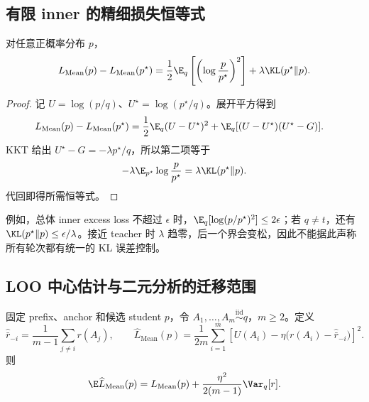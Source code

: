 \subsection{有限 inner 的精细损失恒等式}

\begin{proposition}
\label{prop:mean-opd-excess-identity}
对任意正概率分布 $p$，
\begin{equation}
 L_{\mathrm{Mean}}(p)-L_{\mathrm{Mean}}(p^\star)
 =\frac12\E_q\left[\left(\log\frac p{p^\star}\right)^2\right]
       +\lambda\KL(p^\star\Vert p).
 \label{eq:mean-opd-excess-identity}
\end{equation}
\end{proposition}

\begin{proof}
记 $U=\log(p/q)$、$U^\star=\log(p^\star/q)$。展开平方得到
\begin{align*}
 L_{\mathrm{Mean}}(p)-L_{\mathrm{Mean}}(p^\star)
 &=\frac12\E_q(U-U^\star)^2
   +\E_q[(U-U^\star)(U^\star-G)].
\end{align*}
KKT 给出 $U^\star-G=-\lambda p^\star/q$，所以第二项等于
\[
 -\lambda\E_{p^\star}\log\frac p{p^\star}
 =\lambda\KL(p^\star\Vert p).
\]
代回即得所需恒等式。
\end{proof}

例如，总体 inner excess loss 不超过 $\epsilon$ 时，$\E_q[\log(p/p^\star)^2]\le2\epsilon$；若 $q\ne t$，还有 $\KL(p^\star\Vert p)\le\epsilon/\lambda$。接近 teacher 时 $\lambda$ 趋零，后一个界会变松，因此不能据此声称所有轮次都有统一的 KL 误差控制。

\subsection{LOO 中心估计与二元分析的迁移范围}

\begin{proposition}
\label{prop:mean-opd-loo-expectation}
固定 prefix、anchor 和候选 student $p$，令 $A_1,\ldots,A_m\overset{\mathrm{iid}}\sim q$，$m\ge2$。定义
\[
 \widehat{\bar r}_{-i}=\frac1{m-1}\sum_{j\ne i}r(A_j),
 \qquad
 \widehat L_{\mathrm{Mean}}(p)
 =\frac1{2m}\sum_{i=1}^m
 \left[U(A_i)-\eta\bigl(r(A_i)-\widehat{\bar r}_{-i}\bigr)\right]^2.
\]
则
\begin{equation}
 \E\widehat L_{\mathrm{Mean}}(p)
 =L_{\mathrm{Mean}}(p)
  +\frac{\eta^2}{2(m-1)}\Var_q[r].
 \label{eq:mean-opd-loo-expectation}
\end{equation}
\end{proposition}

